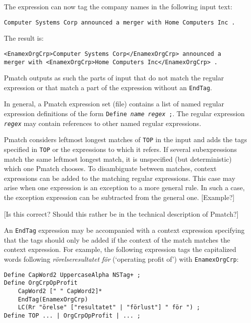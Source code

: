 \documentclass{llncs}
\begin{document}
The expression can now tag the company names in the following input
text:

\begin{verbatim}
Computer Systems Corp announced a merger with Home Computers Inc .
\end{verbatim}

\noindent
The result is:

\begin{verbatim}
<EnamexOrgCrp>Computer Systems Corp</EnamexOrgCrp> announced a
merger with <EnamexOrgCrp>Home Computers Inc</EnamexOrgCrp> .
\end{verbatim}

Pmatch outputs as such the parts of input that do not match the
regular expression or that match a part of the expression without an
\texttt{EndTag}.

In general, a Pmatch expression set (file) contains a list of named
regular expression definitions of the form \texttt{Define
  \textit{name} \textit{regex} ;}. The regular expression
\texttt{\textit{regex}} may contain references to other named regular
expressions.

Pmatch considers leftmost longest matches of \texttt{TOP} in the input
and adds the tags specified in \texttt{TOP} or the expressions to
which it refers. If several subexpressions match the same leftmost
longest match, it is unspecified (but deterministic) which one Pmatch
chooses. To disambiguate between matches, context expressions can be
added to the matching regular expressions. This case may arise when
one expression is an exception to a more general rule. In such a case,
the exception expression can be subtracted from the general one.
\textsf{[Example?]}

\textsf{[Is this correct? Should this rather be in the technical
  description of Pmatch?]}

An \texttt{EndTag} expression may be accompanied with a context
expression specifying that the tags should only be added if the
context of the match matches the context expression. For example, the
following expression tags the capitalized words following
\textit{rörelseresultatet för} (`operating profit of') with
\texttt{EnamexOrgCrp}:

\begin{verbatim}
Define CapWord2 UppercaseAlpha NSTag+ ;
Define OrgCrpOpProfit
    CapWord2 [" " CapWord2]*
    EndTag(EnamexOrgCrp)
    LC(Rr "örelse" ["resultatet" | "förlust"] " för ") ;
Define TOP ... | OrgCrpOpProfit | ... ;
\end{verbatim}
\end{document}
